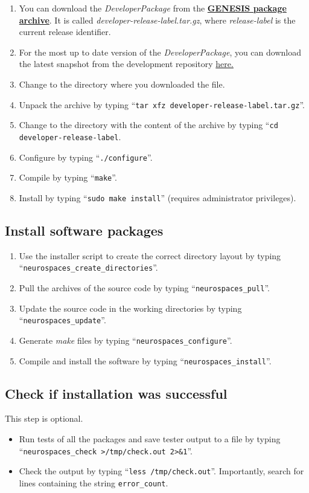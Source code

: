 \documentclass[12pt]{article}
\begin{document}
\begin{enumerate}
   \item You can download the {\it DeveloperPackage} from the \href{http://repo-genesis3.cbi.utsa.edu/src/}{\bf GENESIS package archive}. It is called {\it developer-release-label.tar.gz}, where {\it release-label} is the current release identifier.
   \item For the most up to date version of the {\it DeveloperPackage}, you can download the latest snapshot from the development repository \href{http://repo-genesis3.cbi.utsa.edu/src/}{here.}
   \item Change to the directory where you downloaded the file.
   \item Unpack the archive by typing ``{\tt tar xfz developer-release-label.tar.gz}''.
   \item Change to the directory with the content of the archive by typing ``{\tt cd developer-release-label}.
   \item Configure by typing ``{\tt ./configure}''.
   \item Compile by typing ``{\tt make}''.
   \item Install by typing ``{\tt sudo make install}''  (requires administrator privileges). 
\end{enumerate}

\subsection*{Install software packages}

\begin{enumerate}
   \item Use the installer script to create the correct directory layout by typing ``{\tt neurospaces\_create\_directories}''.
   \item Pull the archives of the source code by typing ``{\tt neurospaces\_pull}''.
   \item Update the source code in the working directories by typing ``{\tt neurospaces\_update}''.
   \item Generate {\it make} files by typing ``{\tt neurospaces\_configure}''.
   \item Compile and install the software by typing ``{\tt neurospaces\_install}''.
\end{enumerate}

\subsection*{Check if installation was successful}

This step is optional.
\begin{itemize}
   \item[] Run tests of all the packages and save tester output to a file  by typing ``{\tt neurospaces\_check >/tmp/check.out 2>\&1}''.
   \item[] Check the output by typing ``{\tt less /tmp/check.out}''. Importantly, search for lines containing the string {\tt error\_count}.
\end{itemize}
 
\end{document}
